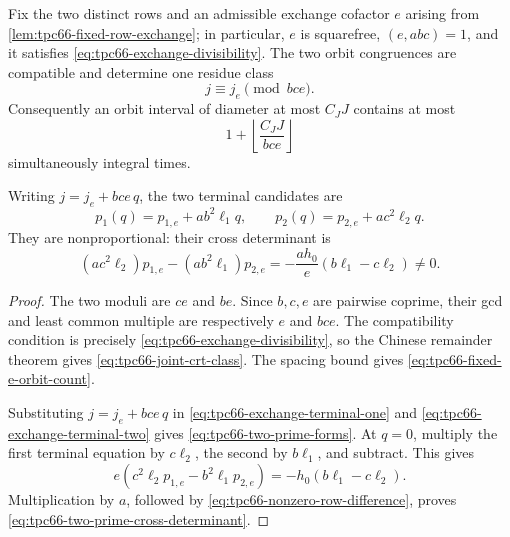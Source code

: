 \begin{proposition}
\label{prop:tpc66-crt-and-prime-forms}
Fix the two distinct rows and an admissible exchange cofactor \(e\) arising
from \cref{lem:tpc66-fixed-row-exchange}; in particular, \(e\) is squarefree,
\((e,abc)=1\), and it satisfies
\eqref{eq:tpc66-exchange-divisibility}.  The two orbit congruences are
compatible and determine one residue class
\begin{equation}
 j\equiv j_e\pmod{bce}.
 \label{eq:tpc66-joint-crt-class}
\end{equation}
Consequently an orbit interval of diameter at most \(C_JJ\) contains at
most
\begin{equation}
 1+\left\lfloor\frac{C_JJ}{bce}\right\rfloor
 \label{eq:tpc66-fixed-e-orbit-count}
\end{equation}
simultaneously integral times.

Writing \(j=j_e+bce\,q\), the two terminal candidates are
\begin{equation}
 p_1(q)=p_{1,e}+ab^2\ell_1q,\qquad
 p_2(q)=p_{2,e}+ac^2\ell_2q.
 \label{eq:tpc66-two-prime-forms}
\end{equation}
They are nonproportional: their cross determinant is
\begin{equation}
 (ac^2\ell_2)p_{1,e}-(ab^2\ell_1)p_{2,e}
 =
 -\frac{ah_0}{e}(b\ell_1-c\ell_2)\ne0.
 \label{eq:tpc66-two-prime-cross-determinant}
\end{equation}
\end{proposition}

\begin{proof}
The two moduli are \(ce\) and \(be\).  Since \(b,c,e\) are pairwise
coprime, their gcd and least common multiple are respectively \(e\) and
\(bce\).  The compatibility condition is precisely
\eqref{eq:tpc66-exchange-divisibility}, so the Chinese remainder theorem
gives \eqref{eq:tpc66-joint-crt-class}.  The spacing bound gives
\eqref{eq:tpc66-fixed-e-orbit-count}.

Substituting \(j=j_e+bce\,q\) in
\eqref{eq:tpc66-exchange-terminal-one} and
\eqref{eq:tpc66-exchange-terminal-two} gives
\eqref{eq:tpc66-two-prime-forms}.  At \(q=0\), multiply the first
terminal equation by \(c\ell_2\), the second by \(b\ell_1\), and
subtract.  This gives
\[
 e(c^2\ell_2p_{1,e}-b^2\ell_1p_{2,e})
 =-h_0(b\ell_1-c\ell_2).
 \]
Multiplication by \(a\), followed by
\eqref{eq:tpc66-nonzero-row-difference}, proves
\eqref{eq:tpc66-two-prime-cross-determinant}.
\end{proof}

